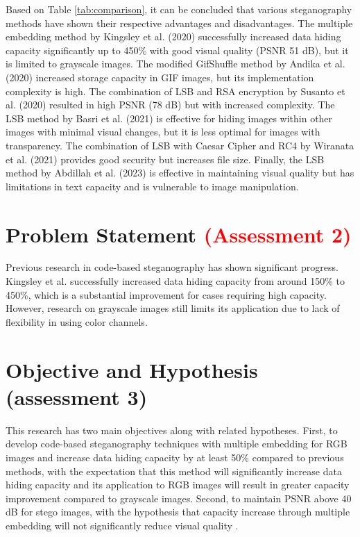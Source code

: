 \documentclass{ittelkom}
\begin{document}
Based on Table \ref{tab:comparison}, it can be concluded that various
steganography methods have shown their respective advantages and disadvantages.
The multiple embedding method by Kingsley et al. (2020) successfully increased
data hiding capacity significantly up to 450\% with good visual quality (PSNR
51 dB), but it is limited to grayscale images. The modified GifShuffle method
by Andika et al. (2020) increased storage capacity in GIF images, but its
implementation complexity is high. The combination of LSB and RSA encryption by
Susanto et al. (2020) resulted in high PSNR (78 dB) but with increased
complexity. The LSB method by Basri et al. (2021) is effective for hiding
images within other images with minimal visual changes, but it is less optimal
for images with transparency. The combination of LSB with Caesar Cipher and RC4
by Wiranata et al. (2021) provides good security but increases file size.
Finally, the LSB method by Abdillah et al. (2023) is effective in maintaining
visual quality but has limitations in text capacity and is vulnerable to image
manipulation.

\section{Problem Statement \textcolor{red}{(Assessment 2)}} \label{request}

Previous research in code-based steganography has shown significant progress.
Kingsley et al. \cite{kingsley2020improving} successfully increased data hiding
capacity from around 150\% to 450\%, which is a substantial improvement for
cases requiring high capacity. However, research on grayscale images
\cite{soetarmono2012studi} still limits its application due to lack of
flexibility in using color channels.

\section{Objective and Hypothesis \color{red}(assessment 3)} \label{hyp}

This research has two main objectives along with related hypotheses. First, to
develop code-based steganography techniques with multiple embedding for RGB
images and increase data hiding capacity by at least 50\% compared to previous
methods, with the expectation that this method will significantly increase data
hiding capacity and its application to RGB images will result in greater
capacity improvement compared to grayscale images. Second, to maintain PSNR
above 40 dB for stego images, with the hypothesis that capacity increase
through multiple embedding will not significantly reduce visual quality
\cite{nasution2018image}.
\end{document}
